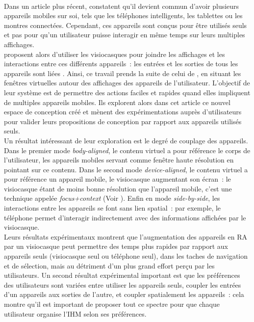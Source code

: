 \paragraph*{}
Dans un article plus récent, \cite{GrubertKranzQuigley2015} constatent qu'il devient commun d'avoir plusieurs appareils mobiles sur soi, tels que les téléphones intelligents, les tablettes ou les montres connectées. Cependant, ces appareils sont conçus pour être utilisés seuls et pas pour qu'un utilisateur puisse interagir en même temps sur leurs multiples affichages.\\
\citeauthor{GrubertKranzQuigley2015} proposent alors d'utiliser les visiocasques pour joindre les affichages et les interactions entre ces différents appareils~: les entrées et les sorties de tous les appareils sont liées . Ainsi, ce travail prends la suite de celui de \citet{EnsFinneganIrani2014}, en situant les fenêtres virtuelles autour des affichages des appareils de l'utilisateur. L'objectif de leur système est de permettre des actions faciles et rapides quand elles impliquent de multiples appareils mobiles. Ils explorent alors dans cet article ce nouvel espace de conception créé et mènent des expérimentations auprès d'utilisateurs pour valider leurs propositions de conception par rapport aux appareils utilisés seuls.\\
Un résultat intéressant de leur exploration est le degré de couplage des appareils. Dans le premier mode \emph{body-aligned}, le contenu virtuel a pour référence le corps de l'utilisateur, les appareils mobiles servant comme fenêtre haute résolution en pointant sur ce contenu. Dans le second mode \emph{device-aligned}, le contenu virtuel a pour référence un appareil mobile, le visiocasque augmentant son écran~: le visiocasque étant de moins bonne résolution que l'appareil mobile, c'est une technique appelée \emph{focus+context} (Voir \cite{BaudischGoodStewart2001}). Enfin en mode \emph{side-by-side}, les interactions entre les appareils se font sans lien spatial~: par exemple, le téléphone permet d'interagir indirectement avec des informations affichées par le visiocasque.\\
Leurs résultats expérimentaux montrent que l'augmentation des appareils en RA par un visiocasque peut permettre des temps plus rapides par rapport aux appareils seuls (visiocasque seul ou téléphone seul), dans les taches de navigation et de sélection, mais au détriment d'un plus grand effort perçu par les utilisateurs. Un second résultat expérimental important est que les préférences des utilisateurs sont variées entre utiliser les appareils seuls, coupler les entrées d'un appareils aux sorties de l'autre, et coupler spatialement les appareils~: cela montre qu'il est important de proposer tout ce spectre pour que chaque utilisateur organise l'IHM selon ses préférences.\\
